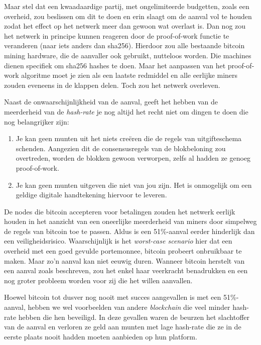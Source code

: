Maar stel dat een kwaadaardige partij, met ongelimiteerde budgetten, zoals een overheid, zou beslissen om dit te doen en erin slaagt om de aanval vol te houden zodat het effect op het netwerk meer dan gewoon wat overlast is. Dan nog zou het netwerk in principe kunnen reageren door de proof-of-work functie te veranderen (naar iets anders dan sha256). Hierdoor zou alle bestaande bitcoin mining hardware, die de aanvaller ook gebruikt, nutteloos worden. Die machines dienen specifiek om sha256 hashes te doen. Maar het aanpassen van het proof-of-work algoritme moet je zien als een laatste redmiddel en alle eerlijke miners zouden eveneens in de klappen delen. Toch zou het netwerk overleven.

Naast de onwaarschijnlijkheid van de aanval, geeft het hebben van de meerderheid van de \textit{hash-rate} je nog altijd het recht niet om dingen te doen die nog belangrijker zijn:

\begin{enumerate}
    \item Je kan geen munten uit het niets creëren die de regels van uitgifteschema schenden. Aangezien dit de consensusregels van de blokbeloning zou overtreden, worden de blokken gewoon verworpen, zelfs al hadden ze genoeg proof-of-work.
    \item Je kan geen munten uitgeven die niet van jou zijn. Het is onmogelijk om een geldige digitale handtekening hiervoor te leveren.
\end{enumerate}

De nodes die bitcoin accepteren voor betalingen zouden het netwerk eerlijk houden in het aanzicht van een oneerlijke meerderheid van miners door simpelweg de regels van bitcoin toe te passen. Aldus is een 51\%-aanval eerder hinderlijk dan een veiligheidsrisico. Waarschijnlijk is het \textit{worst-case scenario} hier dat een overheid met een goed gevulde portemonnee, bitcoin probeert onbruikbaar te maken. Maar zo’n aanval kan niet eeuwig duren. Wanneer bitcoin herstelt van een aanval zoals beschreven, zou het enkel haar veerkracht benadrukken en een nog groter probleem worden voor zij die het willen aanvallen.

Hoewel bitcoin tot dusver nog nooit met succes aangevallen is met een 51\%-aanval, hebben we wel voorbeelden van andere \textit{blockchain} die veel minder hash-rate hebben die hen beveiligd. In deze gevallen waren de beurzen het slachtoffer van de aanval en verloren ze geld aan munten met lage hash-rate die ze in de eerste plaats nooit hadden moeten aanbieden op hun platform.

